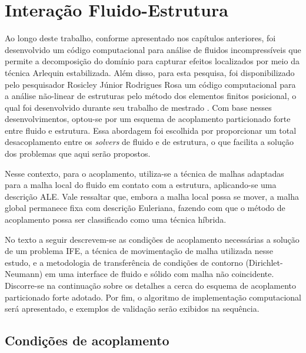 \documentclass[tese_patricia]{subfiles}
\begin{document}
\chapter[Acoplamento Fluido-Estrutura]{Interação Fluido-Estrutura} \label{capitulo:Cap7}


Ao longo deste trabalho, conforme apresentado nos capítulos anteriores, foi desenvolvido um código computacional para análise de fluidos incompressíveis que permite a decomposição do domínio para capturar efeitos localizados por meio da técnica Arlequin estabilizada. Além disso, para esta pesquisa, foi disponibilizado pelo pesquisador Rosicley Júnior Rodrigues Rosa um código computacional para a análise não-linear de estruturas pelo método dos elementos finitos posicional, o qual foi desenvolvido durante seu trabalho de mestrado \cite{Rosa:2021}. Com base nesses desenvolvimentos, optou-se por um esquema de acoplamento particionado forte entre fluido e estrutura. Essa abordagem foi escolhida por proporcionar um total desacoplamento entre os \textit{solvers} de fluido e de estrutura, o que facilita a solução dos problemas que aqui serão propostos.

Nesse contexto, para o acoplamento, utiliza-se a técnica de malhas adaptadas para a malha local do fluido em contato com a estrutura, aplicando-se uma descrição ALE. Vale ressaltar que, embora a malha local possa se mover, a malha global permanece fixa com descrição Euleriana, fazendo com que o método de acoplamento possa ser classificado como uma técnica híbrida.
 
No texto a seguir descrevem-se as condições de acoplamento necessárias a solução de um problema IFE, a técnica de movimentação de malha utilizada nesse estudo, e a metodologia de transferência de condições de contorno (Dirichlet-Neumann) em uma interface de fluido e sólido com malha não coincidente. Discorre-se na continuação sobre os detalhes a cerca do esquema de acoplamento particionado forte adotado. Por fim, o algoritmo de implementação computacional será apresentado, e exemplos de validação serão exibidos na sequência.

\section{Condições de acoplamento}
\end{document}
